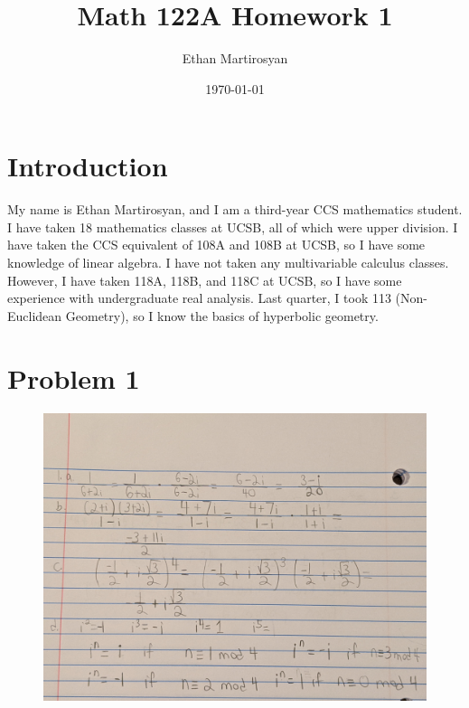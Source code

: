 \documentclass[12pt]{article}
\begin{document}
 
\title{Math 122A Homework 1}
\author{Ethan Martirosyan}
\date{\today}
\maketitle
{}
\hfuzz=50pt
\section*{Introduction}
My name is Ethan Martirosyan, and I am a third-year CCS mathematics student. I have taken 18 mathematics classes at UCSB, all of which were upper division. I have taken the CCS equivalent of 108A and 108B at UCSB, so I have some knowledge of linear algebra. I have not taken any multivariable calculus classes. However, I have taken 118A, 118B, and 118C at UCSB, so I have some experience with undergraduate real analysis. Last quarter, I took 113 (Non-Euclidean Geometry), so I know the basics of hyperbolic geometry.
\newpage
\section*{Problem 1}
\begin{figure}[H]
\centering
\includegraphics[width=\textwidth]{1}
\end{figure}
\newpage
\end{document}
